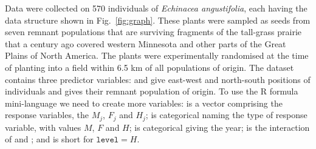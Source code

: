 Data were collected on 570 individuals of \emph{Echinacea angustifolia},
each having the data structure shown in Fig.~\ref{fig:graph}.
These plants were sampled as seeds from seven remnant populations 
that are surviving fragments of the tall-grass prairie that a century
ago covered
western Minnesota and other parts of the Great Plains of North America.
The plants were experimentally randomised 
at the time of planting into a field within 6.5 km of all populations
of origin.  The dataset contains three predictor variables:
\verb@ewloc@ and \verb@nsloc@ give
east-west and north-south positions of individuals
and \verb@pop@ gives their remnant population of origin.
To use the R formula mini-language we need to create
more variables: \verb@resp@ is a vector comprising
the response variables, the $M_j$, $F_j$ and $H_j$;
\verb@level@ is categorical naming the
type of response variable, with values $M$, $F$ and $H$;
\verb@year@ is categorical giving the year;
\verb@varb@ is the interaction of \verb@level@ and \verb@year@;
and \verb@hdct@ is short for $\texttt{level} = H$.

